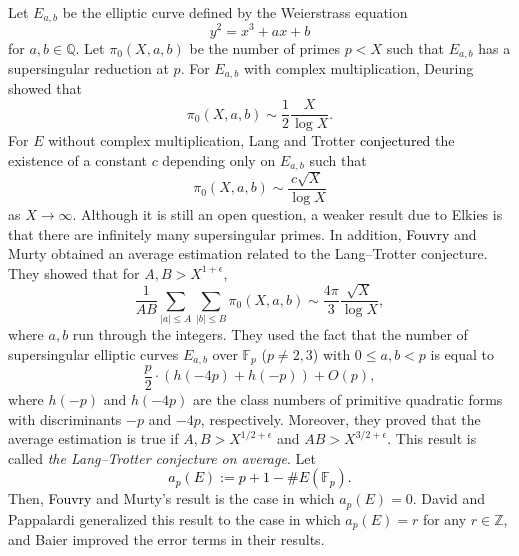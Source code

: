 \documentclass[a4paper, 11pt]{article}
\theoremstyle{plain}
\newcommand{\?}{\textcolor{red}{??}}
\newcommand{\fp}{\mathbb{F}_p}
\newcommand{\bQ}{\mathbb{Q}}
\newcommand{\bZ}{\mathbb{Z}}
\begin{document}
Let $E_{a,b}$ be the elliptic curve defined by the Weierstrass equation 
\[
y^2=x^3+ax+b 
\]
for $a,b \in \bQ$. Let ${\pi}_0(X,a,b)$ be the number of primes $p<X$ such that $E_{a,b}$ has a supersingular reduction at $p$. For $E_{a,b}$ with complex multiplication, Deuring \cite{Deu} showed that 
\[
{\pi}_0(X,a,b) \sim \frac{1}{2} \frac{X}{\log X}.
\]
For $E$ without complex multiplication, Lang and Trotter \cite{LT} \textcolor{black}{conjectured} the existence of a constant $c$ depending only on $E_{a,b}$ such that
\[
{\pi}_0(X,a,b) \sim \frac{c \sqrt{X}}{\log X}
\]
as $X \rightarrow \infty$. Although it is still an open question, a weaker result due to Elkies \cite{Elkies} is that there are infinitely many supersingular primes. %
In addition, \textcolor{black}{Fouvry} and Murty obtained an average estimation related to the Lang--Trotter conjecture. They showed that for $A,B > X^{1+ \epsilon}$, 
\[
\frac{1}{AB} \sum_{\lvert a \rvert \le A} \sum_{\lvert b \rvert \le B} {\pi}_{0}(X,a,b) \sim \frac{4 \pi}{3} \frac{\sqrt{X}}{\log X},
\]
where $a,b$ run  through the integers. They used the fact that the number of supersingular elliptic curves $E_{a,b}$ over $\fp$ ($p \neq2,3$) with $0 \le a,b < p $ is equal to   
\[
\frac{p}{2} \cdot \left(h(-4p)+h(-p) \right)+O(p),
\]
where $h(-p)$ and $h(-4p)$ are the class numbers of primitive quadratic forms with discriminants $-p$ and $-4p$, respectively.
Moreover, they proved that the average estimation is true if $A,B > X^{1/2+ \epsilon}$ and $AB > X^{3/2 +\epsilon}$.
This result is called \textit{the Lang--Trotter conjecture on average}. 
Let \textcolor{black}{\[ a_p(E):=p+1-\#E(\fp).\]} Then, \textcolor{black}{Fouvry} and Murty's result is the case in which $a_p(E)=0$. David and Pappalardi \cite{DP} generalized this result to the case in which $a_p(E)=r$ for any $r \in \bZ$, and Baier \cite{SB} improved the error terms in their results.  
 
\end{document}
